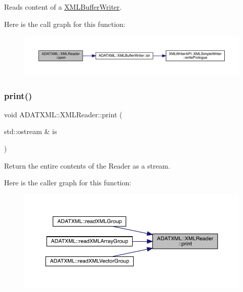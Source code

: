 Reads content of a \mbox{\hyperlink{classADATXML_1_1XMLBufferWriter}{X\+M\+L\+Buffer\+Writer}}. 

Here is the call graph for this function\+:\nopagebreak
\begin{figure}[H]
\begin{center}
\leavevmode
\includegraphics[width=350pt]{db/d3f/classADATXML_1_1XMLReader_a38615b0ae22722bd15a47e27953dc77c_cgraph}
\end{center}
\end{figure}
\mbox{\label{classADATXML_1_1XMLReader_a72513fe6f299e02428bdf4d225163f50}} 
\subsubsection{\texorpdfstring{print()}{print()}\hspace{0.1cm}{\footnotesize\ttfamily [1/2]}}
{\footnotesize\ttfamily void A\+D\+A\+T\+X\+M\+L\+::\+X\+M\+L\+Reader\+::print (\begin{DoxyParamCaption}\item[{std\+::ostream \&}]{is }\end{DoxyParamCaption})}



Return the entire contents of the Reader as a stream. 

Here is the caller graph for this function\+:\nopagebreak
\begin{figure}[H]
\begin{center}
\leavevmode
\includegraphics[width=350pt]{db/d3f/classADATXML_1_1XMLReader_a72513fe6f299e02428bdf4d225163f50_icgraph}
\end{center}
\end{figure}
\mbox{\label{classADATXML_1_1XMLReader_a72513fe6f299e02428bdf4d225163f50}} 
